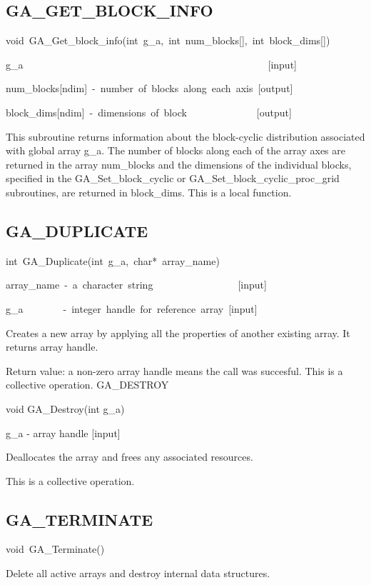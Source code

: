 \subsection*{\label{sub:GA_GET_BLOCK_INFO}GA\_GET\_BLOCK\_INFO}
\begin{lyxcode}
void~GA\_Get\_block\_info(int~g\_a,~int~num\_blocks{[}{]},~int~block\_dims{[}{]})



g\_a~~~~~~~~~~~~~~~~~~~~~~~~~~~~~~~~~~~~~~~~~~~~~~~~~{[}input{]}~

num\_blocks{[}ndim{]}~-~number~of~blocks~along~each~axis~{[}output{]}~

block\_dims{[}ndim{]}~-~dimensions~of~block~~~~~~~~~~~~~~{[}output{]}
\end{lyxcode}
This subroutine returns information about the block-cyclic distribution
associated with global array g\_a. The number of blocks along each
of the array axes are returned in the array num\_blocks and the dimensions
of the individual blocks, specified in the GA\_Set\_block\_cyclic
or GA\_Set\_block\_cyclic\_proc\_grid subroutines, are returned in
block\_dims. This is a local function. 


\subsection*{\label{sub:GA_DUPLICATE}GA\_DUPLICATE}
\begin{lyxcode}
int~GA\_Duplicate(int~g\_a,~char{*}~array\_name)



array\_name~-~a~character~string~~~~~~~~~~~~~~~~~{[}input{]}~

g\_a~~~~~~~~-~integer~handle~for~reference~array~{[}input{]}
\end{lyxcode}
Creates a new array by applying all the properties of another existing
array. It returns array handle.

Return value: a non-zero array handle means the call was succesful.
This is a collective operation. GA\_DESTROY

void GA\_Destroy(int g\_a)

g\_a - array handle {[}input{]}

Deallocates the array and frees any associated resources.

This is a collective operation. 


\subsection*{\label{sub:GA_TERMINATE}GA\_TERMINATE}
\begin{lyxcode}
void~GA\_Terminate()
\end{lyxcode}
Delete all active arrays and destroy internal data structures.


